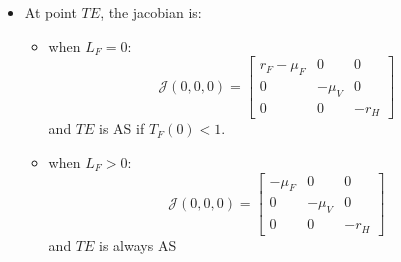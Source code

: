 \documentclass{article}
\begin{document}
\begin{itemize}
\item At point $TE$, the jacobian is:
\begin{itemize}
\item when $L_F = 0$:
\[
\mathcal{J}(0,0,0) = \begin{bmatrix}
r_F- \mu_F & 0 & 0 \\ 0 &- \mu_V & 0 \\ 0 & 0 & -r_H
\end{bmatrix}
\] and $TE$ is AS if $T_F(0) < 1$.
\item when $L_F > 0$:
\[
\mathcal{J}(0,0,0) = \begin{bmatrix}
- \mu_F & 0 & 0 \\ 0 &- \mu_V & 0 \\ 0 & 0 & -r_H
\end{bmatrix}
\] 
and $TE$ is always AS
\end{itemize}


\end{itemize}
\end{document}
